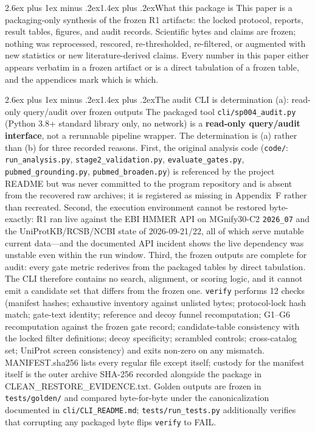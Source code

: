 \documentclass[11pt]{article}
\makeatletter
\renewcommand{\subsection}{\@startsection{subsection}{2}{\z@}%
  {2.6ex plus 1ex minus .2ex}{1.4ex plus .2ex}{\large\bfseries\color{navy}}}
\makeatother
\begin{document}
\subsection{What this package is}
This paper is a packaging-only synthesis of the frozen R1 artifacts: the locked protocol, reports, result tables, figures, and audit records. Scientific bytes and claims are frozen; nothing was reprocessed, rescored, re-thresholded, re-filtered, or augmented with new statistics or new literature-derived claims. Every number in this paper either appears verbatim in a frozen artifact or is a direct tabulation of a frozen table, and the appendices mark which is which.

\subsection{The audit CLI is determination (a): read-only query/audit over frozen outputs}
The packaged tool \texttt{cli/sp004\_audit.py} (Python 3.8+ standard library only, no network) is a \textbf{read-only query/audit interface}, not a rerunnable pipeline wrapper. The determination is (a) rather than (b) for three recorded reasons. First, the original analysis code (\texttt{code/}: \texttt{run\_analysis.py}, \texttt{stage2\_validation.py}, \texttt{evaluate\_gates.py}, \texttt{pubmed\_grounding.py}, \texttt{pubmed\_broaden.py}) is referenced by the project README but was never committed to the program repository and is absent from the recovered raw archives; it is registered as missing in Appendix~F rather than recreated. Second, the execution environment cannot be restored byte-exactly: R1 ran live against the EBI HMMER API on MGnify30-C2 \texttt{2026\_07} and the UniProtKB/RCSB/NCBI state of 2026-09-21/22, all of which serve mutable current data---and the documented API incident shows the live dependency was unstable even within the run window. Third, the frozen outputs are complete for audit: every gate metric rederives from the packaged tables by direct tabulation. The CLI therefore contains no search, alignment, or scoring logic, and it cannot emit a candidate set that differs from the frozen one. \texttt{verify} performs 12 checks (manifest hashes; exhaustive inventory against unlisted bytes; protocol-lock hash match; gate-text identity; reference and decoy funnel recomputation; G1--G6 recomputation against the frozen gate record; candidate-table consistency with the locked filter definitions; decoy specificity; scrambled controls; cross-catalog set; UniProt screen consistency) and exits non-zero on any mismatch. MANIFEST.sha256 lists every regular file except itself; custody for the manifest itself is the outer archive SHA-256 recorded alongside the package in CLEAN\_RESTORE\_EVIDENCE.txt. Golden outputs are frozen in \texttt{tests/golden/} and compared byte-for-byte under the canonicalization documented in \texttt{cli/CLI\_README.md}; \texttt{tests/run\_tests.py} additionally verifies that corrupting any packaged byte flips \texttt{verify} to FAIL.
\end{document}

